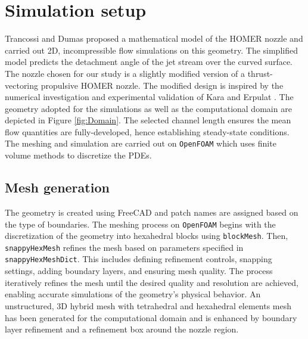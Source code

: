 \section{Simulation setup} \label{setup}
Trancossi and Dumas \cite{trandum} proposed a mathematical model of the HOMER nozzle and carried out 2D, incompressible flow simulations on this geometry. The simplified model predicts the detachment angle of the jet stream over the curved surface. The nozzle chosen for our study is a slightly modified version of a thrust-vectoring propulsive HOMER nozzle. The modified design is inspired by the numerical investigation and experimental validation of Kara and Erpulat \cite{kara}. The geometry adopted for the simulations as well as the computational domain are depicted in Figure \ref{fig:Domain}. The selected channel length ensures the mean flow quantities are fully-developed, hence establishing steady-state conditions. The meshing and simulation are carried out on \verb|OpenFOAM| which uses finite volume methods to discretize the PDEs. 
\subsection{Mesh generation}
The geometry is created using FreeCAD \cite{FreeCAD} and patch names are assigned based on the type of boundaries.  The meshing process on \verb|OpenFOAM| begins with the discretization of the geometry into hexahedral blocks using \verb|blockMesh|. Then, \verb|snappyHexMesh| refines the mesh based on parameters specified in \verb|snappyHexMeshDict|. This includes defining refinement controls, snapping settings, adding boundary layers, and ensuring mesh quality. The process iteratively refines the mesh until the desired quality and resolution are achieved, enabling accurate simulations of the geometry's physical behavior. An unstructured, 3D hybrid mesh with tetrahedral and hexahedral elements mesh has been generated for the computational domain and is enhanced by boundary layer refinement and a refinement box around the nozzle region.
